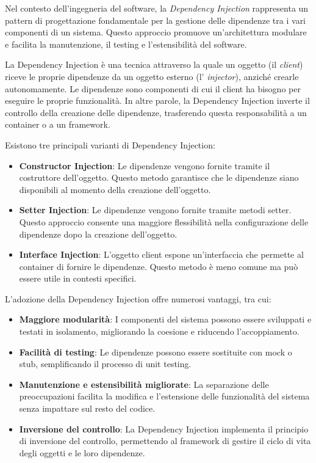 \documentclass[12pt,a4paper,openright,twoside]{book}
\begin{document}
Nel contesto dell'ingegneria del software, la \textit{Dependency Injection} rappresenta un pattern di progettazione fondamentale per la gestione
 delle dipendenze tra i vari componenti di un sistema. Questo approccio promuove un'architettura modulare e facilita la manutenzione, il testing e l'estensibilità del software.

La Dependency Injection è una tecnica attraverso la quale un oggetto (il \textit{client}) riceve le proprie dipendenze da un oggetto esterno 
(l' \textit{injector}), anziché crearle autonomamente. Le dipendenze sono componenti di cui il client ha bisogno per eseguire le proprie funzionalità.
 In altre parole, la Dependency Injection inverte il controllo della creazione delle dipendenze, trasferendo questa responsabilità a un container o a un framework.

Esistono tre principali varianti di Dependency Injection:
\begin{itemize}
\item \textbf{Constructor Injection}: Le dipendenze vengono fornite tramite il costruttore dell'oggetto. 
    Questo metodo garantisce che le dipendenze siano disponibili al momento della creazione dell'oggetto.
\item \textbf{Setter Injection}: Le dipendenze vengono fornite tramite metodi setter. 
    Questo approccio consente una maggiore flessibilità nella configurazione delle dipendenze dopo la creazione dell'oggetto.
\item \textbf{Interface Injection}: L'oggetto client espone un'interfaccia che permette al container di fornire le dipendenze. 
    Questo metodo è meno comune ma può essere utile in contesti specifici.
\end{itemize}

L'adozione della Dependency Injection offre numerosi vantaggi, tra cui:
\begin{itemize}
    \item \textbf{Maggiore modularità}: I componenti del sistema possono essere sviluppati e testati in isolamento, migliorando la coesione e riducendo l'accoppiamento.
    \item \textbf{Facilità di testing}: Le dipendenze possono essere sostituite con mock o stub, semplificando il processo di unit testing.
    \item \textbf{Manutenzione e estensibilità migliorate}: La separazione delle preoccupazioni facilita la modifica e l'estensione delle funzionalità del sistema
     senza impattare sul resto del codice.
    \item \textbf{Inversione del controllo}: La Dependency Injection implementa il principio di inversione del controllo,
     permettendo al framework di gestire il ciclo di vita degli oggetti e le loro dipendenze.
\end{itemize}
\end{document}
